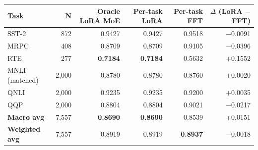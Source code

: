 \begin{tabular}{lrrrrr}
\toprule
\textbf{Task} & \textbf{N} & \textbf{Oracle LoRA MoE} & \textbf{Per-task LoRA} & \textbf{Per-task FFT} & \textbf{$\Delta$ (LoRA $-$ FFT)} \\
\midrule
SST-2          &   872 & 0.9427 & 0.9427 & 0.9518 & $-$0.0091 \\
MRPC           &   408 & 0.8709 & 0.8709 & 0.9105 & $-$0.0396 \\
RTE            &   277 & \textbf{0.7184} & \textbf{0.7184} & 0.5632 & $+$0.1552 \\
MNLI (matched) & 2,000 & 0.8780 & 0.8780 & 0.8760 & $+$0.0020 \\
QNLI           & 2,000 & 0.9235 & 0.9235 & 0.9200 & $+$0.0035 \\
QQP            & 2,000 & 0.8804 & 0.8804 & 0.9021 & $-$0.0217 \\
\midrule
\textbf{Macro avg}    & 7,557 & \textbf{0.8690} & \textbf{0.8690} & 0.8539 & $+$0.0151 \\
\textbf{Weighted avg} & 7,557 & 0.8919 & 0.8919 & \textbf{0.8937} & $-$0.0018 \\
\bottomrule
\end{tabular}
